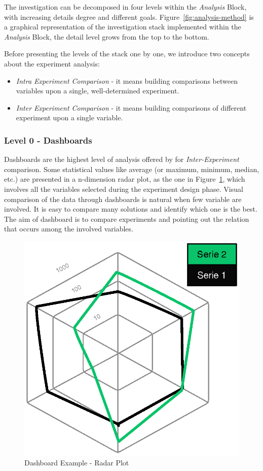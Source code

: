 The investigation can be decomposed in four levels within the \textit{Analysis} Block, with increasing details degree and different goals. Figure~\ref{fig:analysis-method} is a graphical representation of the investigation stack implemented within the \textit{Analysis} Block, the detail level grows from the top to the bottom.

\pagebreak

\noindent Before presenting the levels of the stack one by one, we introduce two concepts about the experiment analysis:
\begin{itemize}
\item \textit{Intra Experiment Comparison} -  it means building comparisons between variables upon a single, well-determined experiment.
\item \textit{Inter Experiment Comparison} -  it means building comparisons of different experiment upon a single variable. 
\end{itemize}


\subsubsection{Level 0 - Dashboards}\label{sec:heaven-level0}

Dashboards are the highest level of analysis offered by \name for \textit{Inter-Experiment} comparison. Some statistical values like average (or maximum, minimum, median, etc.) are presented in a n-dimension radar plot, as the one in Figure~\ref{fig:radar}, which involves all the variables selected during the experiment design phase. Visual comparison of the data through dashboards is natural when few variable are involved. It is easy to compare many solutions and identify which one is the best. The aim of dashboard is to compare experiments and pointing out the relation that occurs among the involved variables.

\begin{figure}[tbh]
  \centering
	\includegraphics[width=0.5\linewidth]{images/radar-plot}
	\caption{Dashboard Example - Radar Plot} 	
  	\label{fig:radar}
\end{figure}

